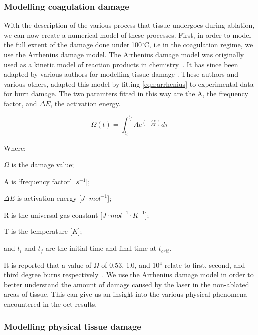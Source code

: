 \subsubsection{Modelling coagulation damage}\label{sec:coagdamage}
With the description of the various process that tissue undergoes during ablation, we can now create a numerical model of these processes.
First, in order to model the full extent of the damage done under 100${^{\circ}}$C, i.e in the coagulation regime, we use the Arrhenius damage model. The Arrhenius damage model was originally used as a kinetic model of reaction products in chemistry~\cite{pearce2009relationship}. It has since been adapted by various authors for modelling tissue damage \cite{hendriques1947studies,jiang2002effects}. These authors and various others, adapted this model by fitting \cref{eqn:arrhenius} to experimental data for burn damage. The two paramters fitted in this way are the A, the frequency factor, and $\Delta E$, the activation energy.

\begin{equation}
\Omega(t)=\int^{t_{f}}_{t_i} Ae^{(-\tfrac{\Delta E}{RT})}d\tau
\label{eqn:arrhenius}
\end{equation}


\noindent Where:

	\indent $\Omega$ is the damage value;
	
	\indent A is `frequency factor' [$s^{-1}$];
	
	\indent $\Delta E$ is activation energy [$J\cdot mol^{-1}$];
	
	\indent R is the universal gas constant [$J\cdot mol^{-1}\cdot K^{-1}$];
	
	\indent T is the temperature [$K$];
	
	\indent and $t_i$ and $t_f$ are the initial time and final time at $t_{crit}$.
	
	\medskip

It is reported that a value of $\Omega$ of 0.53, 1.0, and 10$^4$ relate to first, second, and third degree burns respectively~\cite{diller1983finite}. We use the Arrhenius damage model in order to better understand the amount of damage caused by the laser in the non-ablated areas of tissue. This can give us an insight into the various physical phenomena encountered in the \gls{oct} results.

\subsubsection{Modelling physical tissue damage}

